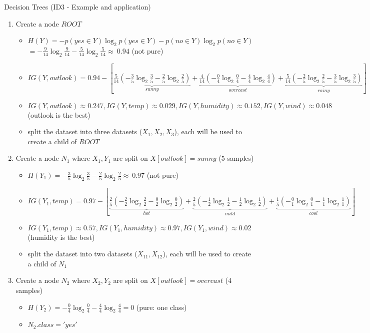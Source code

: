 \documentclass{KBook}
\begin{document}
	Decision Trees (ID3 - Example and application)
	\begin{enumerate}
		\item Create a node $ ROOT $
		\begin{itemize}\tiny\bfseries
			\item $ H(Y) = - p(yes \in Y) \log_2 p(yes\in Y) - p(no \in Y) \log_2 p(no\in Y)  $
			$ = -\frac{9}{14} \log_2 \frac{9}{14} - \frac{5}{14} \log_2 \frac{5}{14} \approx\ 0.94$ (not pure)
			\item $ IG(Y, outlook) = 0.94 - [ \underbrace{\frac{5}{14} (- \frac{3}{5} \log_2 \frac{3}{5} - \frac{2}{5} \log_2 \frac{2}{5} )}_{sunny} + \underbrace{\frac{4}{14} (- \frac{0}{4} \log_2 \frac{0}{4} - \frac{4}{4} \log_2 \frac{4}{4})}_{overcast} +  \underbrace{\frac{5}{14} (- \frac{2}{5} \log_2 \frac{2}{5} - \frac{3}{5} \log_2 \frac{3}{5})}_{rainy} ]$
			\item $ IG(Y, outlook) \approx 0.247 , IG(Y, temp) \approx 0.029 , IG(Y, humidity) \approx 0.152 ,  IG(Y, wind) \approx 0.048 $ (outlook is the best)
			\item split the dataset into three datasets ($ X_1, X_2, X_3 $), each will be used to create a child of $ ROOT $
		\end{itemize}
		
		\item Create a node $ N_1 $ where $ X_1, Y_1 $ are split on $ X[outlook] = sunny$ (5 samples)
		\begin{itemize}\tiny\bfseries
			\item $ H(Y_1) = - \frac{3}{5} \log_2 \frac{3}{5} - \frac{2}{5} \log_2 \frac{2}{5} \approx\ 0.97$ (not pure)
			\item $ IG(Y_1, temp) = 0.97 - [ \underbrace{\frac{2}{5} (- \frac{2}{2} \log_2 \frac{2}{2} - \frac{0}{2} \log_2 \frac{0}{2} )}_{hot} + \underbrace{\frac{2}{5} (- \frac{1}{2} \log_2 \frac{1}{2} - \frac{1}{2} \log_2 \frac{1}{2})}_{mild} +  \underbrace{\frac{1}{5} (- \frac{0}{1} \log_2 \frac{0}{1} - \frac{1}{1} \log_2 \frac{1}{1})}_{cool} ]$
			\item $ IG(Y_1, temp) \approx 0.57 , IG(Y_1, humidity) \approx 0.97 ,  IG(Y_1, wind) \approx 0.02 $ (humidity is the best)
			\item split the dataset into two datasets ($ X_{11}, X_{12}$), each will be used to create a child of $ N_1 $
		\end{itemize}
		
		\item Create a node $ N_2 $ where $ X_2, Y_2 $ are split on $ X[outlook] = overcast$ (4 samples)
		\begin{itemize}\tiny\bfseries
			\item $ H(Y_2) = - \frac{0}{4} \log_2 \frac{0}{4} - \frac{4}{4} \log_2 \frac{4}{4} = 0$ (pure: one class)
			\item $ N_2.class = 'yes' $
		\end{itemize}
		
	\end{enumerate}
\end{document}
